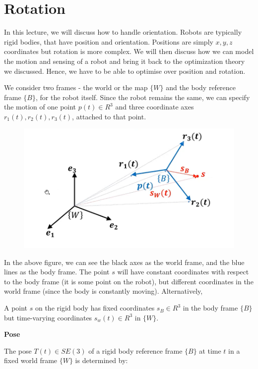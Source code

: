 \chapter{Rotation}
\graphicspath{{../../img/}}


In this lecture, we will discuss how to handle orientation. Robots are typically rigid bodies, that have position and orientation. Positions are simply $x,y, z$ coordinates but rotation is more complex. We will then discuss how we can model the motion and sensing of a robot and bring it back to the optimization theory we discussed. Hence, we have to be able to optimise over position and rotation.

We consider two frames - the world or the map $\{W\}$ and the body reference frame $\{B\}$, for the robot itself. Since the robot remains the same, we can specify the motion of one point $p(t) \in R^3$ and three coordinate axes $r_1(t), r_2(t), r_3(t)$, attached to that point.

\begin{figure}[h]\centering\includegraphics[width=12cm]{img/j_1.png}\end{figure}

In the above figure, we can see the black axes as the world frame, and the blue lines as the body frame. The point $s$ will have constant coordinates with respect to the body frame (it is some point on the robot), but different coordinates in the world frame (since the body is constantly moving). Alternatively,

A point $s$ on the rigid body has fixed coordinates $s_B\in R^3$ in the body frame $\{B\}$ but time-varying coordinates $s_w(t)\in R^3$ in $\{W\}$.

\textbf{Pose}

The pose $T(t)\in SE(3)$ of a rigid body reference frame $\{B\}$ at time $t$ in a fixed world frame $\{W\}$ is determined by:

